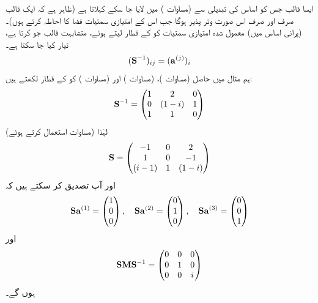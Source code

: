 ایسا قالب جس کو اساس کی تبدیلی سے    (مساوات )   میں لایا جا سکے     کہلاتا ہے (ظاہر ہے کہ  ایک قالب  صرف اور صرف  اس صورت   وتر پذیر   ہوگا جب اس کے امتیازی سمتیات فضا کا احاطہ کرتے ہوں)۔   (پرانی اساس میں)  معمول شدہ امتیازی سمتیات  کو  کے قطار لیتے ہوئے،   متشابہت قالب جو   کرتا  ہے،  تیار کیا جا سکتا ہے۔
\begin{align}
	(\operatorname{\mathbf{S}}^{-1})_{ij} = (\operatorname{\mathbf{a}}^{(j)})_i
\end{align}
ہم  مثال   میں حاصل   (مساوات )،   (مساوات ) اور   (مساوات ) کو  کے قطار لکھتے ہیں:
\begin{align*}
	\operatorname{\mathbf{S}}^{-1} =
	\begin{pmatrix}
		1 & 2 & 0\\
		0 & (1-i) & 1\\
		1 & 1 & 0
	\end{pmatrix}
\end{align*}
لہٰذا     (مساوات   استعمال کرتے ہوئے)
\begin{align*}
	\operatorname{\mathbf{S}}=
	\begin{pmatrix}
		-1 & 0 & 2\\
		1 & 0 & -1\\
		(i-1) & 1 & (1-i)
	\end{pmatrix}
\end{align*}
اور آپ تصدیق کر سکتے ہیں کہ
\begin{align*}
	\operatorname{\mathbf{Sa}}^{(1)}=
	\begin{pmatrix}
		1\\0\\0
	\end{pmatrix}
	,\quad
	\operatorname{\mathbf{Sa}}^{(2)}=
	\begin{pmatrix}
		0\\1\\0
	\end{pmatrix}
	,\quad
	\operatorname{\mathbf{Sa}}^{(3)}=
	\begin{pmatrix}
		0\\0\\1
	\end{pmatrix}
\end{align*}
اور
\begin{align*}
	\operatorname{\mathbf{SMS}}^{-1}=
	\begin{pmatrix}
		0 & 0 & 0\\
		0 & 1 & 0\\
		0 & 0 & i
	\end{pmatrix}
\end{align*}
ہوں گے۔


